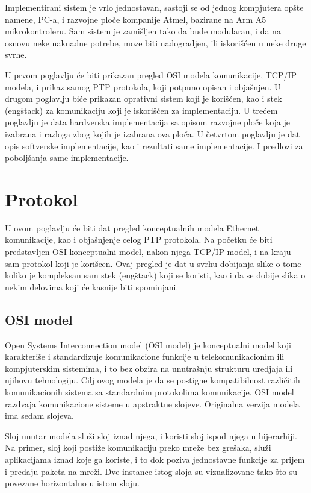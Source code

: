 \documentclass[a4paper,12pt, master]{etf}
\begin{document}
	Implementirani sistem je vrlo jednostavan, sastoji se od jednog kompjutera
	op\v{s}te namene, PC-a, i razvojne plo\v{c}e kompanije Atmel, bazirane na
	Arm A5 mikrokontroleru. Sam sistem je zami\v{s}ljen tako da bude modularan,
	i da na osnovu neke naknadne potrebe, moze biti nadogradjen, ili
	iskori\v{s}\'{c}en u neke druge svrhe.

	U prvom poglavlju \'{c}e biti prikazan pregled OSI modela komunikacije,
	TCP/IP modela, i prikaz samog PTP protokola, koji potpuno opisan i
	obja\v{s}njen. U drugom poglavlju bi\'{c}e prikazan oprativni sistem koji
	je kori\v{s}\'{c}en, kao i stek (eng\. stack) za komunikaciju koji je
	iskori\v{s}\'{c}en za implementaciju. U tre\'{c}em poglavlju je data
	hardverska implementacija sa opisom razvojne plo\v{c}e koja je izabrana i
	razloga zbog kojih je izabrana ova plo\v{c}a. U \v{c}etvrtom poglavlju je
	dat opis softverske implementacije, kao i rezultati same implementacije. I
	predlozi za pobolj\v{s}anja same implementacije.

	\newpage

	\chapter{Protokol}

	U ovom poglavlju \'{c}e biti dat pregled konceptualnih modela Ethernet
	komunikacije, kao i obja\v{s}njenje	celog PTP protokola. Na po\v{c}etku
	\'{c}e biti predstavljen OSI konceptualni model, nakon njega TCP/IP	model,
	i na kraju sam protokol koji je kori\v{s}cen. Ovaj pregled je dat u svrhu
	dobijanja slike o tome koliko je kompleksan sam stek (eng\. stack) koji se
    koristi, kao i da se dobije slika o nekim delovima koji \'{c}e kasnije biti
    spominjani.

	\section{OSI model}

	Open Systems Interconnection model (OSI model) je konceptualni model koji
	karakteri\v{s}e i standardizuje komunikacione funkcije u telekomunikacionim
	ili kompjuterskim sistemima, i to bez obzira na unutra\v{s}nju strukturu
	uredjaja ili njihovu tehnologiju. Cilj ovog modela je da se postigne
	kompatibilnost razli\v{c}itih komunikacionih sistema sa standardnim
	protokolima komunikacije. OSI model razdvaja komunikacione sisteme u
	apstraktne slojeve.	Originalna verzija modela ima sedam slojeva.

	Sloj unutar modela slu\v{z}i sloj iznad njega, i koristi sloj ispod njega u
	hijerarhiji. Na	primer, sloj koji posti\v{z}e komunikaciju preko mre\v{z}e
	bez gre\v{s}aka, slu\v{z}i aplikacijama iznad koje ga koriste, i to dok
	poziva jednostavne funkcije za prijem i predaju paketa na mre\v{z}i.
	Dve instance istog sloja su vizualizovane tako \v{s}to su povezane
	horizontalno u istom sloju.
\end{document}
